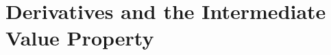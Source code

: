 
\setcounter{section}{1}
\section{Derivatives and the Intermediate Value Property}
\setcounter{exercise}{0}



